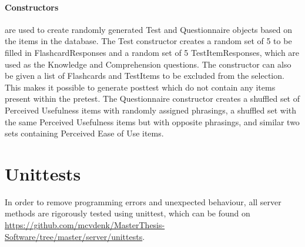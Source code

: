 \paragraph{Constructors} are used to create randomly generated Test and Questionnaire objects based on the items in the database. The Test constructor creates a random set of 5 to be filled in FlashcardResponses and a random set of 5 TestItemResponses, which are used as the Knowledge and Comprehension questions. The constructor can also be given a list of Flashcards and TestItems to be excluded from the selection. This makes it possible to generate posttest which do not contain any items present within the pretest. The Questionnaire constructor creates a shuffled set of Perceived Usefulness items with randomly assigned phrasings, a shuffled set with the same Perceived Usefulness items but with opposite phrasings, and similar two sets containing Perceived Ease of Use items.

\section{Unittests}

In order to remove programming errors and unexpected behaviour, all server methods are rigorously tested using unittest, which can be found on \url{https://github.com/mcvdenk/MasterThesis-Software/tree/master/server/unittests}.
